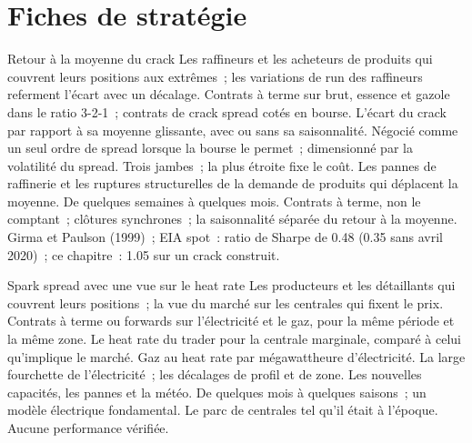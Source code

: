 \section{Fiches de stratégie}

\begin{strategyfile}{Retour à la moyenne du crack}\label{strat:s2:commodity-spreads:crack}
 Les raffineurs et les acheteurs de produits qui couvrent leurs positions aux extrêmes~; les variations de run des raffineurs referment l'écart avec un décalage.
 Contrats à terme sur brut, essence et gazole dans le ratio 3-2-1~; contrats de crack spread cotés en bourse.
 L'écart du crack par rapport à sa moyenne glissante, avec ou sans sa saisonnalité.
 Négocié comme un seul ordre de spread lorsque la bourse le permet~; dimensionné par la volatilité du spread.
 Trois jambes~; la plus étroite fixe le coût.
 Les pannes de raffinerie et les ruptures structurelles de la demande de produits qui déplacent la moyenne.
 De quelques semaines à quelques mois.
 Contrats à terme, non le comptant~; clôtures synchrones~; la saisonnalité séparée du retour à la moyenne.
 Girma et Paulson (1999)~; EIA spot~: ratio de Sharpe de 0.48 (0.35 sans avril 2020)~; ce chapitre~: 1.05 sur un crack construit.
\end{strategyfile}

\begin{strategyfile}{Spark spread avec une vue sur le heat rate}\label{strat:s2:commodity-spreads:spark}
 Les producteurs et les détaillants qui couvrent leurs positions~; la vue du marché sur les centrales qui fixent le prix.
 Contrats à terme ou forwards sur l'électricité et le gaz, pour la même période et la même zone.
 Le heat rate du trader pour la centrale marginale, comparé à celui qu'implique le marché.
 Gaz au heat rate par mégawattheure d'électricité.
 La large fourchette de l'électricité~; les décalages de profil et de zone.
 Les nouvelles capacités, les pannes et la météo.
 De quelques mois à quelques saisons~; un modèle électrique fondamental.
 Le parc de centrales tel qu'il était à l'époque.
 Aucune performance vérifiée.
\end{strategyfile}

